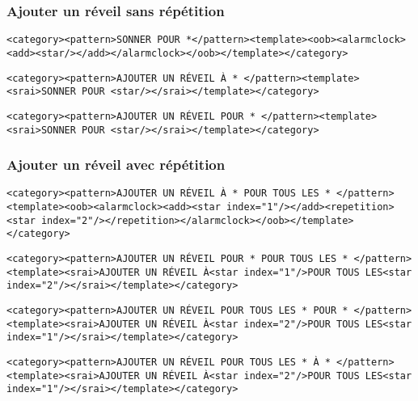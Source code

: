 \subsubsection{Ajouter un réveil sans répétition}
\begin{lstlisting}[frame=none,aboveskip=0.5em]
<category><pattern>SONNER POUR *</pattern><template><oob><alarmclock>
<add><star/></add></alarmclock></oob></template></category>
\end{lstlisting}

\begin{lstlisting}[frame=none,aboveskip=0.5em]
<category><pattern>AJOUTER UN RÉVEIL À * </pattern><template><srai>SONNER POUR <star/></srai></template></category>
\end{lstlisting}

\begin{lstlisting}[frame=none,aboveskip=0.5em]
<category><pattern>AJOUTER UN RÉVEIL POUR * </pattern><template><srai>SONNER POUR <star/></srai></template></category>
\end{lstlisting}

\subsubsection{Ajouter un réveil avec répétition}
\begin{lstlisting}[frame=none,aboveskip=0.5em]
<category><pattern>AJOUTER UN RÉVEIL À * POUR TOUS LES * </pattern><template><oob><alarmclock><add><star index="1"/></add><repetition><star index="2"/></repetition></alarmclock></oob></template></category>
\end{lstlisting}

\begin{lstlisting}[frame=none,aboveskip=0.5em]
<category><pattern>AJOUTER UN RÉVEIL POUR * POUR TOUS LES * </pattern><template><srai>AJOUTER UN RÉVEIL À<star index="1"/>POUR TOUS LES<star index="2"/></srai></template></category>
\end{lstlisting}

\begin{lstlisting}[frame=none,aboveskip=0.5em]
<category><pattern>AJOUTER UN RÉVEIL POUR TOUS LES * POUR * </pattern><template><srai>AJOUTER UN RÉVEIL À<star index="2"/>POUR TOUS LES<star index="1"/></srai></template></category>
\end{lstlisting}

\begin{lstlisting}[frame=none,aboveskip=0.5em]
<category><pattern>AJOUTER UN RÉVEIL POUR TOUS LES * À * </pattern><template><srai>AJOUTER UN RÉVEIL À<star index="2"/>POUR TOUS LES<star index="1"/></srai></template></category>
\end{lstlisting}

